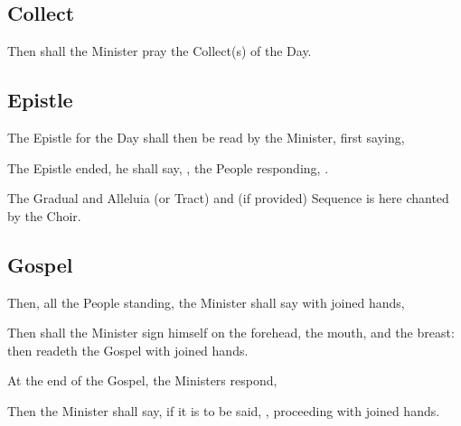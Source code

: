 \clearpage
\subsection{Collect}
\begin{rubric}
	Then shall the Minister pray the Collect(s) of the Day.
\end{rubric}
\subsection{Epistle}
\begin{rubric}
	The Epistle for the Day shall then be read by the Minister, first saying, 
\end{rubric}
\begin{rubric}
	The Epistle ended, he shall say, , the People responding, .
\end{rubric}
\begin{rubric}
    The Gradual and Alleluia (or Tract) and (if provided) Sequence is here chanted by the Choir.
\end{rubric}
\subsection{Gospel}
\begin{rubric}
	Then, all the People standing, the Minister shall say with joined hands,
\end{rubric}
\begin{rubric}
    Then shall the Minister sign himself on the forehead, the mouth, and the breast: then readeth the Gospel with joined hands.
\end{rubric}
\begin{rubric}
    At the end of the Gospel, the Ministers respond,
\end{rubric}
\begin{rubric}
    Then the Minister shall say, if it is to be said, , proceeding with joined hands.
\end{rubric}
